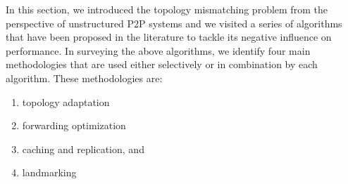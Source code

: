 In this section, we introduced the topology mismatching problem from the
perspective of unstructured P2P systems and we visited a series
of algorithms that have been proposed in the literature to tackle its negative
influence on performance. In surveying the above algorithms, we identify
four main methodologies that are used either selectively or in combination
by each algorithm.  
These methodologies are:
\begin{enumerate}
  \item topology adaptation
  \item forwarding optimization
  \item caching and replication, and
  \item landmarking
\end{enumerate}


